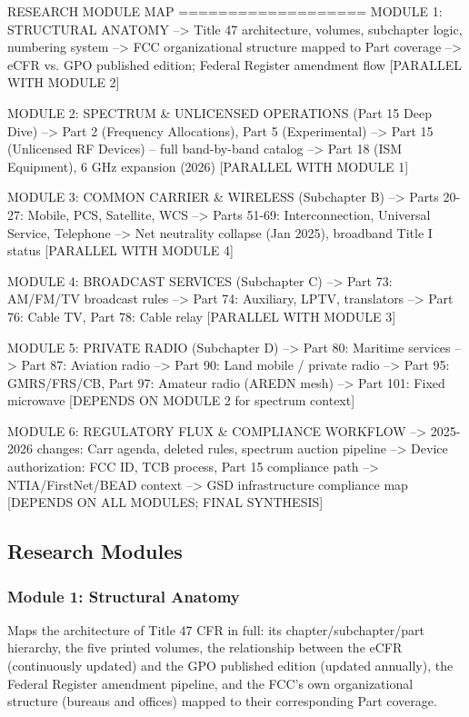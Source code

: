 \documentclass[11pt,letterpaper]{article}
\begin{document}
\begin{asciibox}
RESEARCH MODULE MAP
===================
MODULE 1: STRUCTURAL ANATOMY
  --> Title 47 architecture, volumes, subchapter logic, numbering system
  --> FCC organizational structure mapped to Part coverage
  --> eCFR vs. GPO published edition; Federal Register amendment flow
  [PARALLEL WITH MODULE 2]

MODULE 2: SPECTRUM \& UNLICENSED OPERATIONS (Part 15 Deep Dive)
  --> Part 2 (Frequency Allocations), Part 5 (Experimental)
  --> Part 15 (Unlicensed RF Devices) -- full band-by-band catalog
  --> Part 18 (ISM Equipment), 6 GHz expansion (2026)
  [PARALLEL WITH MODULE 1]

MODULE 3: COMMON CARRIER \& WIRELESS (Subchapter B)
  --> Parts 20-27: Mobile, PCS, Satellite, WCS
  --> Parts 51-69: Interconnection, Universal Service, Telephone
  --> Net neutrality collapse (Jan 2025), broadband Title I status
  [PARALLEL WITH MODULE 4]

MODULE 4: BROADCAST SERVICES (Subchapter C)
  --> Part 73: AM/FM/TV broadcast rules
  --> Part 74: Auxiliary, LPTV, translators
  --> Part 76: Cable TV, Part 78: Cable relay
  [PARALLEL WITH MODULE 3]

MODULE 5: PRIVATE RADIO (Subchapter D)
  --> Part 80: Maritime services
  --> Part 87: Aviation radio
  --> Part 90: Land mobile / private radio
  --> Part 95: GMRS/FRS/CB, Part 97: Amateur radio (AREDN mesh)
  --> Part 101: Fixed microwave
  [DEPENDS ON MODULE 2 for spectrum context]

MODULE 6: REGULATORY FLUX \& COMPLIANCE WORKFLOW
  --> 2025-2026 changes: Carr agenda, deleted rules, spectrum auction pipeline
  --> Device authorization: FCC ID, TCB process, Part 15 compliance path
  --> NTIA/FirstNet/BEAD context
  --> GSD infrastructure compliance map
  [DEPENDS ON ALL MODULES; FINAL SYNTHESIS]
\end{asciibox}

\subsection{Research Modules}

\subsubsection{Module 1: Structural Anatomy}
Maps the architecture of Title 47 CFR in full: its chapter/subchapter/part hierarchy, the five printed volumes, the relationship between the eCFR (continuously updated) and the GPO published edition (updated annually), the Federal Register amendment pipeline, and the FCC's own organizational structure (bureaus and offices) mapped to their corresponding Part coverage.
\end{document}
